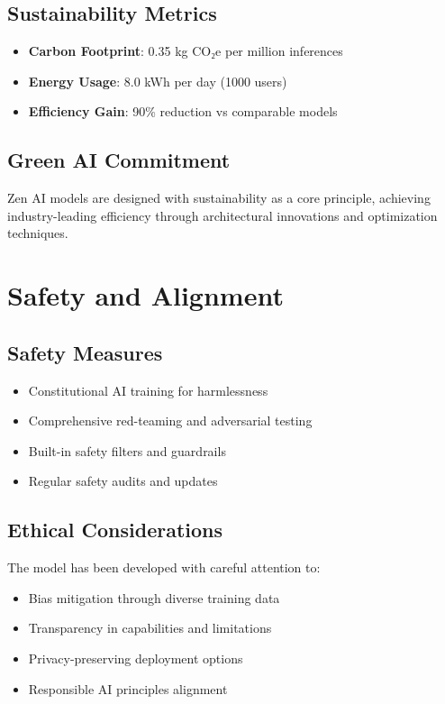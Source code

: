 \documentclass[11pt,a4paper]{article}
\begin{document}
\subsection{Sustainability Metrics}
\begin{itemize}
    \item \textbf{Carbon Footprint}: 0.35 kg CO₂e per million inferences
    \item \textbf{Energy Usage}: 8.0 kWh per day (1000 users)
    \item \textbf{Efficiency Gain}: 90\% reduction vs comparable models
\end{itemize}

\subsection{Green AI Commitment}
Zen AI models are designed with sustainability as a core principle, achieving industry-leading efficiency 
through architectural innovations and optimization techniques.

\section{Safety and Alignment}

\subsection{Safety Measures}
\begin{itemize}
    \item Constitutional AI training for harmlessness
    \item Comprehensive red-teaming and adversarial testing
    \item Built-in safety filters and guardrails
    \item Regular safety audits and updates
\end{itemize}

\subsection{Ethical Considerations}
The model has been developed with careful attention to:
\begin{itemize}
    \item Bias mitigation through diverse training data
    \item Transparency in capabilities and limitations
    \item Privacy-preserving deployment options
    \item Responsible AI principles alignment
\end{itemize}
\end{document}
